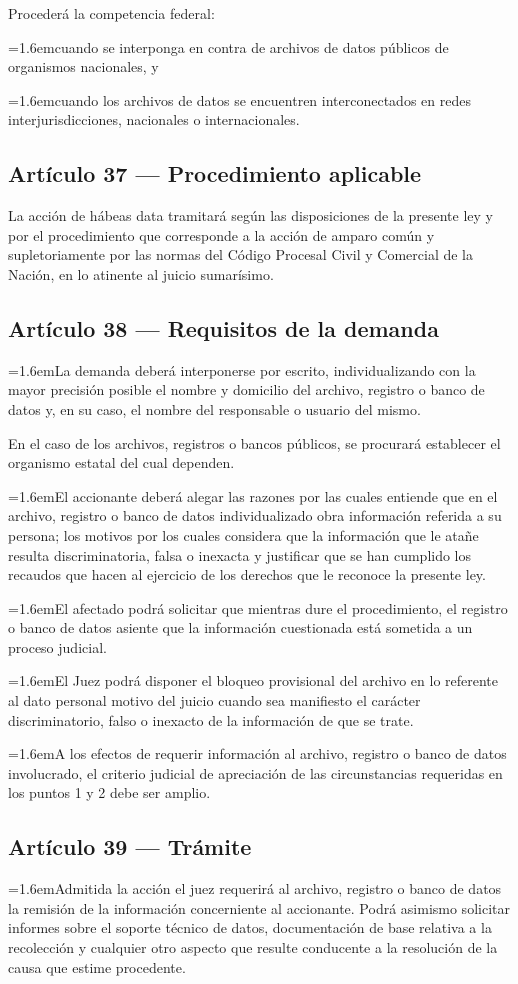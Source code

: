 \documentclass[10pt,a4paper]{article}
\newcommand{\articulo}[1]{\subsection{#1}}
\newcommand{\inciso}[2]{\par{\hangindent=1.6em\hangafter=1\makebox[1.6em][l]{#1}#2\par}}
\begin{document}
Procederá la competencia federal:

\inciso{a)}{cuando se interponga en contra de archivos de datos públicos de organismos nacionales, y}

\inciso{b)}{cuando los archivos de datos se encuentren interconectados en redes interjurisdicciones, nacionales o internacionales.}

\articulo{Artículo 37 --- Procedimiento aplicable}
La acción de hábeas data tramitará según las disposiciones de la presente ley y por el procedimiento que corresponde a la acción de amparo común y supletoriamente por las normas del Código Procesal Civil y Comercial de la Nación, en lo atinente al juicio sumarísimo.

\articulo{Artículo 38 --- Requisitos de la demanda}
\inciso{1.}{La demanda deberá interponerse por escrito, individualizando con la mayor precisión posible el nombre y domicilio del archivo, registro o banco de datos y, en su caso, el nombre del responsable o usuario del mismo.}

En el caso de los archivos, registros o bancos públicos, se procurará establecer el organismo estatal del cual dependen.

\inciso{2.}{El accionante deberá alegar las razones por las cuales entiende que en el archivo, registro o banco de datos individualizado obra información referida a su persona; los motivos por los cuales considera que la información que le atañe resulta discriminatoria, falsa o inexacta y justificar que se han cumplido los recaudos que hacen al ejercicio de los derechos que le reconoce la presente ley.}

\inciso{3.}{El afectado podrá solicitar que mientras dure el procedimiento, el registro o banco de datos asiente que la información cuestionada está sometida a un proceso judicial.}

\inciso{4.}{El Juez podrá disponer el bloqueo provisional del archivo en lo referente al dato personal motivo del juicio cuando sea manifiesto el carácter discriminatorio, falso o inexacto de la información de que se trate.}

\inciso{5.}{A los efectos de requerir información al archivo, registro o banco de datos involucrado, el criterio judicial de apreciación de las circunstancias requeridas en los puntos 1 y 2 debe ser amplio.}

\articulo{Artículo 39 --- Trámite}
\inciso{1.}{Admitida la acción el juez requerirá al archivo, registro o banco de datos la remisión de la información concerniente al accionante. Podrá asimismo solicitar informes sobre el soporte técnico de datos, documentación de base relativa a la recolección y cualquier otro aspecto que resulte conducente a la resolución de la causa que estime procedente.}
\end{document}
